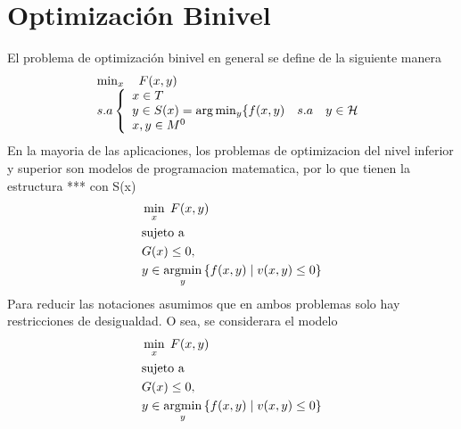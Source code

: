 \section{Optimización Binivel }
El problema de optimización binivel en general se define de la siguiente manera
\begin{equation} \label{eq:Def1Binivel}
    \begin{array}{l}
       \min_{x} \quad F(x, y)\\
        s.a \left\{ \begin{array}{l}
            x \in T \\
             y \in S(x) = \arg  \min_{y} \{ f(x, y) \quad s.a \quad y \in  \cal{H}\\
            x,y \in M^0 
        \end{array}\right.
        \end{array} \end{equation}
En la mayoria de las aplicaciones, los problemas de optimizacion del nivel inferior y superior son modelos de programacion matematica, por lo  que tienen la estructura  *** con S(x)
\begin{equation}
\begin{aligned}
& \min_{x} \; F(x, y) \\
& \text{sujeto a } \\
& G(x) \leq 0, \\
& y \in \operatorname*{argmin}_{y} \left\{ f(x, y) \mid v(x, y) \leq 0 \right\}
\end{aligned}
\label{eq:ProblemaGeneral}
\end{equation}
Para reducir las notaciones asumimos que en ambos problemas solo hay restricciones de desigualdad. O sea, se considerara el modelo 
\begin{equation}
\begin{aligned}
& \min_{x} \; F(x, y) \\
& \text{sujeto a } \\
& G(x) \leq 0, \\
& y \in \operatorname*{argmin}_{y} \left\{ f(x, y) \mid v(x, y) \leq 0 \right\}
\end{aligned}
\label{eq:ProblemaGeneral}
\end{equation} 



